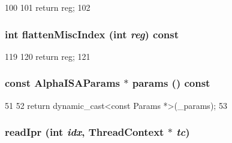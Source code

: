 \begin{DoxyCode}
100         {
101             return reg;
102         }
\end{DoxyCode}
\hypertarget{classAlphaISA_1_1ISA_a8997760aa4425793911f57440a4dd8ae}{
\subsubsection[{flattenMiscIndex}]{\setlength{\rightskip}{0pt plus 5cm}int flattenMiscIndex (int {\em reg}) const}}
\label{classAlphaISA_1_1ISA_a8997760aa4425793911f57440a4dd8ae}



\begin{DoxyCode}
119         {
120             return reg;
121         }
\end{DoxyCode}
\hypertarget{classAlphaISA_1_1ISA_a0968f22111d8484ab76cc2d65d1ad57d}{
\subsubsection[{params}]{\setlength{\rightskip}{0pt plus 5cm}const AlphaISAParams $\ast$ params () const}}
\label{classAlphaISA_1_1ISA_a0968f22111d8484ab76cc2d65d1ad57d}



\begin{DoxyCode}
51 {
52     return dynamic_cast<const Params *>(_params);
53 }
\end{DoxyCode}
\hypertarget{classAlphaISA_1_1ISA_adc7402a9cc2aaeb6bbb7bf5c3f7c4d18}{
\subsubsection[{readIpr}]{ readIpr (int {\em idx}, \/  {\bf ThreadContext} $\ast$ {\em tc})}}
\label{classAlphaISA_1_1ISA_adc7402a9cc2aaeb6bbb7bf5c3f7c4d18}



